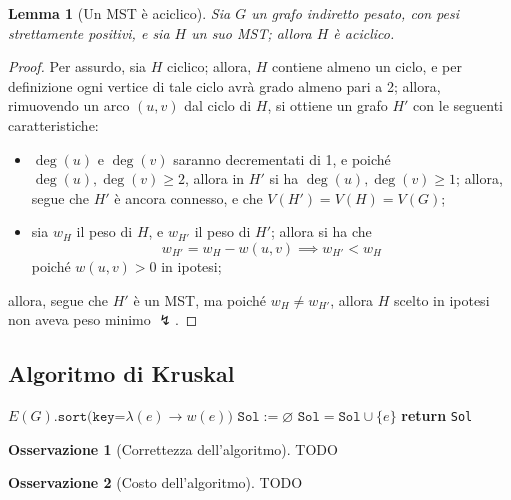 \documentclass[14pt]{extreport}
\newtheorem{lemma}{Lemma}[subsection]
\theoremstyle{definition}
\theoremstyle{definition}
\newtheorem{remark}{Osservazione}[subsection]
\begin{document}
\begin{lemma}[Un MST è aciclico]
    Sia $G$ un grafo indiretto pesato, con pesi strettamente positivi, e sia $H$ un suo MST; allora $H$ è aciclico.
\end{lemma}

\begin{proof}
    Per assurdo, sia $H$ ciclico; allora, $H$ contiene almeno un ciclo, e per definizione ogni vertice di tale ciclo avrà grado almeno pari a 2; allora, rimuovendo un arco $(u, v)$ dal ciclo di $H$, si ottiene un grafo $H'$ con le seguenti caratteristiche:

    \begin{itemize}
        \item $\deg(u)$ e $\deg(v)$ saranno decrementati di 1, e poiché $\deg(u), \deg(v) \ge 2$, allora in $H'$ si ha $\deg(u), \deg(v) \ge 1$; allora, segue che $H'$ è ancora connesso, e che $V(H') = V(H) = V(G)$;
        \item sia $w_H$ il peso di $H$, e $w_{H'}$ il peso di $H'$; allora si ha che $$w_{H'} = w_H - w(u, v) \implies w_{H'} < w_H$$ poiché $w(u, v) > 0$ in ipotesi;
    \end{itemize}

    allora, segue che $H'$ è un MST, ma poiché $w_H \neq w_{H'}$, allora $H$ scelto in ipotesi non aveva peso minimo $\lightning$.
\end{proof}

\subsection{Algoritmo di Kruskal}

\begin{algorithm}[H]
    \caption{
        Dato un grafo indiretto $G$, pesato attraverso $w$, l'algoritmo ne restituisce un MST.\\
        \textbf{Input}: $G$ grafo indiretto; $w$ una funzione che associa pesi agli archi in $E(G)$.\\
        \textbf{Output}: un MST di $G$.
    }

    \begin{algorithmic}[1]
            \State $E(G)\texttt{.sort(key=}\lambda (e) \rightarrow w(e)\texttt{)}$ 
            \State $\texttt{Sol}:= \varnothing$
             
                    \State $\texttt{Sol} = \texttt{Sol} \cup \{e\}$
                \EndIf
            \EndFor
            \State \textbf{return} \texttt{Sol}
        \EndFunction
    \end{algorithmic}
\end{algorithm}

\begin{remark}[Correttezza dell'algoritmo]
    TODO
\end{remark}

\begin{remark}[Costo dell'algoritmo]
    TODO
\end{remark}
\end{document}
